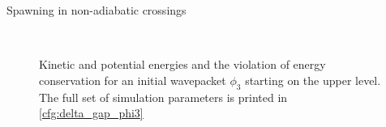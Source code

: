 \begin{chapter}{Spawning in non-adiabatic crossings}
\begin{figure}[h!]
  \centering
   \\
  \caption[Energies for a $\phi_3$ in an avoided crossing]{
  Kinetic and potential energies and the violation of energy conservation for an
  initial wavepacket $\phi_3$ starting on the upper level. The full set of simulation
  parameters is printed in \ref{cfg:delta_gap_phi3}
  \label{fig:basic_delta_gap_phi3_energies}
  }
\end{figure}




\end{chapter}
